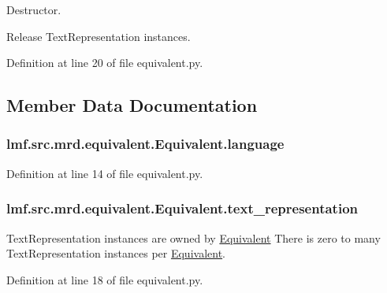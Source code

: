 Destructor. 

Release Text\+Representation instances. 

Definition at line 20 of file equivalent.\+py.



\subsection{Member Data Documentation}
\hypertarget{classlmf_1_1src_1_1mrd_1_1equivalent_1_1_equivalent_a72fc245f7193aba7f5c132eee799bcde}{
\subsubsection[{language}]{\setlength{\rightskip}{0pt plus 5cm}lmf.\+src.\+mrd.\+equivalent.\+Equivalent.\+language}}\label{classlmf_1_1src_1_1mrd_1_1equivalent_1_1_equivalent_a72fc245f7193aba7f5c132eee799bcde}


Definition at line 14 of file equivalent.\+py.

\hypertarget{classlmf_1_1src_1_1mrd_1_1equivalent_1_1_equivalent_a6912524a8f1ac4a8203f6fa386d2f5a1}{
\subsubsection[{text\+\_\+representation}]{\setlength{\rightskip}{0pt plus 5cm}lmf.\+src.\+mrd.\+equivalent.\+Equivalent.\+text\+\_\+representation}}\label{classlmf_1_1src_1_1mrd_1_1equivalent_1_1_equivalent_a6912524a8f1ac4a8203f6fa386d2f5a1}


Text\+Representation instances are owned by \hyperlink{classlmf_1_1src_1_1mrd_1_1equivalent_1_1_equivalent}{Equivalent} There is zero to many Text\+Representation instances per \hyperlink{classlmf_1_1src_1_1mrd_1_1equivalent_1_1_equivalent}{Equivalent}. 



Definition at line 18 of file equivalent.\+py.

